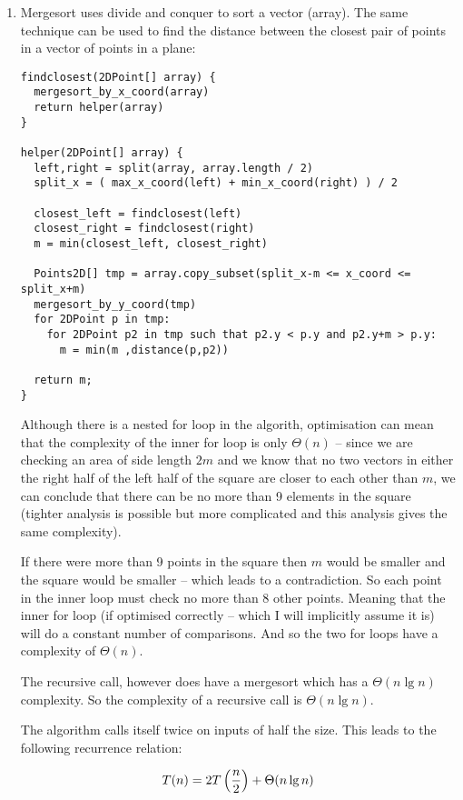\documentclass[10pt,\jkfside,a4paper]{article}
\begin{document}
\begin{enumerate}

\item Mergesort uses divide and conquer to sort a vector (array). The same technique can 
be used to find the distance between the closest pair of points in a vector of points in 
a plane:

\begin{lstlisting}
findclosest(2DPoint[] array) {
  mergesort_by_x_coord(array)
  return helper(array)
}

helper(2DPoint[] array) {
  left,right = split(array, array.length / 2)
  split_x = ( max_x_coord(left) + min_x_coord(right) ) / 2
  
  closest_left = findclosest(left)
  closest_right = findclosest(right)
  m = min(closest_left, closest_right)
  
  Points2D[] tmp = array.copy_subset(split_x-m <= x_coord <= split_x+m)
  mergesort_by_y_coord(tmp)
  for 2DPoint p in tmp:
    for 2DPoint p2 in tmp such that p2.y < p.y and p2.y+m > p.y:
      m = min(m ,distance(p,p2))

  return m;
}
\end{lstlisting}

Although there is a nested for loop in the algorith, optimisation can mean that the complexity 
of the inner for loop is only $\Theta(n)$ -- since we are checking an area of side length $2m$ and we know 
that no two vectors in either the right half of the left half of the square are closer to each 
other than $m$, we can conclude that there can be no more than 9 elements in the square (tighter analysis 
is possible but more complicated and this analysis gives the same complexity).

If there were more than 9 points in the square then $m$ would be smaller and the square would be smaller 
-- which leads to a contradiction. So each point in the inner loop must check no more than 8 other 
points. Meaning that the inner for loop (if optimised correctly -- which I will implicitly assume it is) 
will do a constant number of comparisons. And so the two for loops have a complexity of $\Theta(n)$.

The recursive call, however does have a mergesort which has a $\Theta(n\lg n)$ complexity.
So the complexity of a recursive call is $\Theta(n \lg n)$.

The algorithm calls itself twice on inputs of half the size.
This leads to the following recurrence relation:

\begin{equation}
T(n) = 2T\left(\frac{n}{2}\right) + \Theta(n\lg n)\\
\end{equation}


\end{enumerate}
\end{document}
